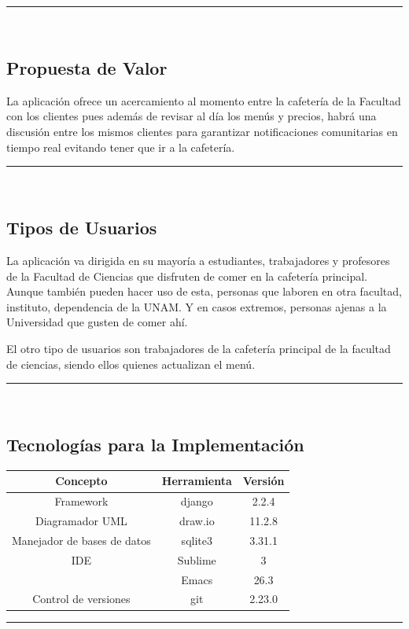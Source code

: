 \documentclass{article}
\begin{document}
\rule{0.8\textwidth}{.8pt}\\

\subsection*{Propuesta de Valor}

La aplicación ofrece un acercamiento al momento entre la cafetería de la
Facultad con los clientes pues además de revisar al día los menús y precios,
habrá una discusión entre los mismos clientes para garantizar notificaciones
comunitarias en tiempo real evitando tener que ir a la cafetería.

\rule{0.8\textwidth}{.8pt}\\

\subsection*{Tipos de Usuarios}

La aplicación va dirigida en su mayoría a estudiantes, trabajadores y profesores
de la Facultad de Ciencias que disfruten de comer en la cafetería principal.
Aunque también pueden hacer uso de esta, personas que laboren en otra facultad,
instituto, dependencia de la UNAM. Y en casos extremos, personas ajenas a la
Universidad que gusten de comer ahí. 

El otro tipo de usuarios son trabajadores de la cafetería principal de la
facultad de ciencias, siendo ellos quienes actualizan el menú.

\rule{0.8\textwidth}{.8pt}\\

\subsection*{Tecnologías para la Implementación}

\begin{center}
  \begin{tabular}{| c | c | c |} \hline
    Concepto & Herramienta & Versión \\\hline
    Framework & django & 2.2.4 \\\hline
    Diagramador UML & draw.io & 11.2.8 \\\hline
    Manejador de bases de datos & sqlite3 & 3.31.1 \\\hline
    IDE & Sublime & 3 \\
    & Emacs & 26.3 \\\hline
    Control de versiones & git & 2.23.0 \\\hline
  \end{tabular}
\end{center}

\rule{0.8\textwidth}{.8pt}\\
\end{document}
